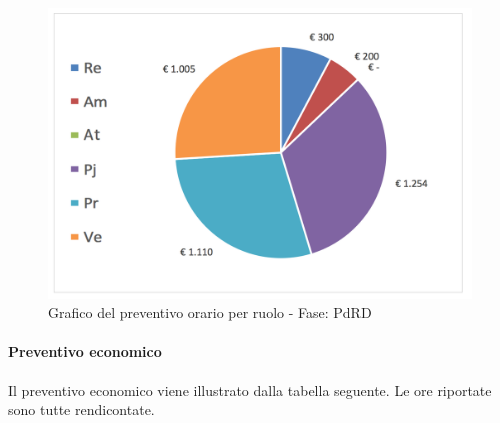 			\begin{figure}[H]
			\centering
			\includegraphics[scale=0.32]{img/h_r_PdRD}
			\caption{Grafico del preventivo orario per ruolo - Fase: PdRD}
			\label{fig:h_r_PdRD"}
			\end{figure}

			\newpage
			\paragraph{Preventivo economico}
			Il preventivo economico viene illustrato dalla tabella seguente. Le ore riportate sono tutte rendicontate.\\

